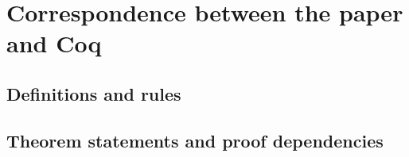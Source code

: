 \chapter{Correspondence between the paper and Coq}
\label{app:correspondence}

\section{Definitions and rules}

\section{Theorem statements and proof dependencies}
